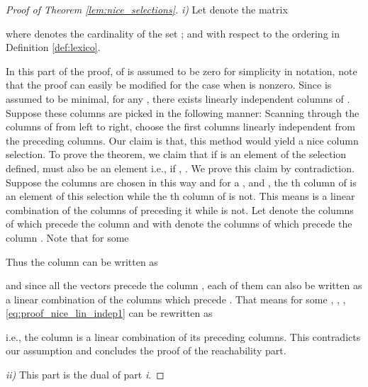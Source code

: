 \documentclass[journal]{IEEEtran}
\begin{document}
\begin{proof}[Proof of Theorem \ref{lem:nice_selections}]
\emph{i)} Let  denote the matrix

where  denotes the cardinality of the set ;  and  with respect to the ordering in Definition \ref{def:lexico}.

In this part of the proof,  of  is assumed to be zero for simplicity in notation, note that the proof can easily be modified for the case when  is nonzero. Since  is assumed to be minimal, for any , there exists  linearly independent columns of . Suppose these columns are picked in the following manner: Scanning through the columns of  from left to right, choose the first  columns linearly independent from the preceding columns. Our claim is that, this method would yield a nice column selection. To prove the theorem, we claim that if  is an element of the selection defined,  must also be an element i.e., if , . We prove this claim by contradiction. Suppose the columns are chosen in this way and for a ,  and , the th column of  is an element of this selection while the th column of  is not. This means  is a linear combination of the columns of  preceding it while  is not. Let  denote the columns of  which precede the column  and  with  denote the columns of  which precede the column . Note that for some 

Thus the column  can be written as

and since all the vectors  precede the column , each of them can also be written as a linear combination of the columns  which precede . That means for some , , , \eqref{eq:proof_nice_lin_indep1} can be rewritten as

i.e., the column  is a linear combination of its preceding columns. This contradicts our assumption and concludes the proof of the reachability part.

\emph{ii)} This part is the dual of part \emph{i}.
\end{proof}











\ifCLASSOPTIONcaptionsoff
  \newpage
\fi











\end{document}

